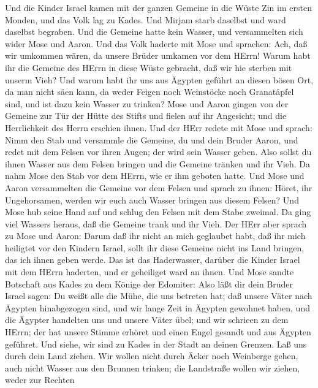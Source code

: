  Und die Kinder Israel kamen mit der ganzen Gemeine in die
Wüste Zin im ersten Monden, und das Volk lag zu Kades. Und Mirjam starb
daselbst und ward daselbst begraben.  Und die Gemeine hatte
kein Wasser, und versammelten sich wider Mose und Aaron. 
Und das Volk haderte mit Mose und sprachen: Ach, daß wir umkommen wären,
da unsere Brüder umkamen vor dem HErrn!  Warum habt ihr die
Gemeine des HErrn in diese Wüste gebracht, daß wir hie sterben mit
unserm Vieh?  Und warum habt ihr uns aus Ägypten geführt an
diesen bösen Ort, da man nicht säen kann, da weder Feigen noch
Weinstöcke noch Granatäpfel sind, und ist dazu kein Wasser zu trinken?
 Mose und Aaron gingen von der Gemeine zur Tür der Hütte des
Stifts und fielen auf ihr Angesicht; und die Herrlichkeit des Herrn
erschien ihnen.  Und der HErr redete mit Mose und sprach:
 Nimm den Stab und versammle die Gemeine, du und dein Bruder
Aaron, und redet mit dem Felsen vor ihren Augen; der wird sein Wasser
geben. Also sollst du ihnen Wasser aus dem Felsen bringen und die
Gemeine tränken und ihr Vieh.  Da nahm Mose den Stab vor dem
HErrn, wie er ihm geboten hatte.  Und Mose und Aaron
versammelten die Gemeine vor dem Felsen und sprach zu ihnen: Höret, ihr
Ungehorsamen, werden wir euch auch Wasser bringen aus diesem Felsen?
 Und Mose hub seine Hand auf und schlug den Felsen mit dem
Stabe zweimal. Da ging viel Wassers heraus, daß die Gemeine trank und
ihr Vieh.  Der HErr aber sprach zu Mose und Aaron: Darum
daß ihr nicht an mich geglaubet habt, daß ihr mich heiligtet vor den
Kindern Israel, sollt ihr diese Gemeine nicht ins Land bringen, das ich
ihnen geben werde.  Das ist das Haderwasser, darüber die
Kinder Israel mit dem HErrn haderten, und er geheiliget ward an ihnen.
 Und Mose sandte Botschaft aus Kades zu dem Könige der
Edomiter: Also läßt dir dein Bruder Israel sagen: Du weißt alle die
Mühe, die uns betreten hat;  daß unsere Väter nach Ägypten
hinabgezogen sind, und wir lange Zeit in Ägypten gewohnet haben, und die
Ägypter handelten uns und unsere Väter übel;  und wir
schrieen zu dem HErrn; der hat unsere Stimme erhöret und einen Engel
gesandt und aus Ägypten geführet. Und siehe, wir sind zu Kades in der
Stadt an deinen Grenzen.  Laß uns durch dein Land ziehen.
Wir wollen nicht durch Äcker noch Weinberge gehen, auch nicht Wasser aus
den Brunnen trinken; die Landstraße wollen wir ziehen, weder zur Rechten
